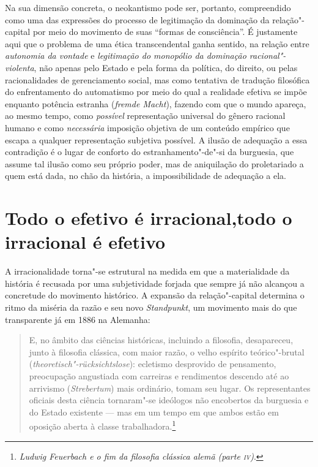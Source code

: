Na sua dimensão concreta, o neokantismo pode ser, portanto, compreendido
como uma das expressões do processo de legitimação da dominação da
relação"-capital por meio do movimento de suas ``formas de
consciência''. É justamente aqui que o problema de uma ética
transcendental ganha sentido, na relação entre \emph{autonomia da
vontade} e \emph{legitimação do monopólio da dominação
racional"-violenta}, não apenas pelo Estado e pela forma da política, do
direito, ou pelas racionalidades de gerenciamento social, mas como
tentativa de tradução filosófica do enfrentamento do automatismo por
meio do qual a realidade efetiva se impõe enquanto potência estranha
(\emph{fremde Macht}), fazendo com que o mundo apareça, ao mesmo tempo,
como \emph{possível} representação universal do gênero racional humano e
como \emph{necessária} imposição objetiva de um conteúdo empírico que
escapa a qualquer representação subjetiva possível. A ilusão de
adequação a essa contradição é o lugar de conforto do
estranhamento"-de"-si da burguesia, que assume tal ilusão como seu
próprio poder, mas de aniquilação do proletariado a quem está dada, no
chão da história, a impossibilidade de adequação a ela.

\section*{Todo o efetivo é irracional,\break todo o irracional é efetivo}

A irracionalidade torna"-se estrutural na medida em que a materialidade
da história é recusada por uma subjetividade forjada que sempre já não
alcançou a concretude do movimento histórico. A expansão da
relação"-capital determina o ritmo da miséria da razão e seu novo
\emph{Standpunkt}, um movimento mais do que transparente já em 1886 na
Alemanha:

\begin{quote}
E, no âmbito das ciências históricas, incluindo a filosofia,
desapareceu, junto à filosofia clássica, com maior razão, o velho
espírito teórico"-brutal (\emph{theoretisch"-rücksichtslose}):
ecletismo desprovido de pensamento, preocupação angustiada com carreiras
e rendimentos descendo até ao arrivismo (\emph{Strebertum}) mais
ordinário, tomam seu lugar. Os representantes oficiais desta ciência
tornaram"-se ideólogos não encobertos da burguesia e do Estado
existente --- mas em um tempo em que ambos estão em oposição aberta à
classe trabalhadora.\footnote{\emph{Ludwig Feuerbach e o fim da
  filosofia clássica alemã (parte \textsc{iv})}.}
\end{quote}

